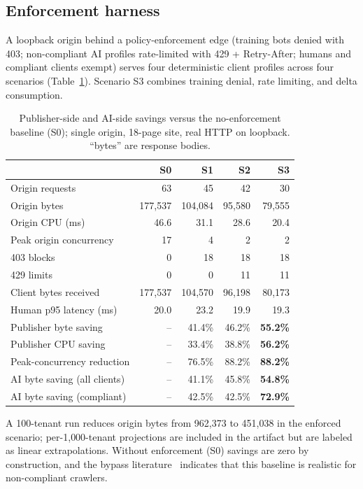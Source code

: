 \documentclass[11pt]{article}
\begin{document}
\subsection{Enforcement harness}

A loopback origin behind a policy-enforcement edge (training bots denied with 403;
non-compliant AI profiles rate-limited with 429 + Retry-After; humans and compliant
clients exempt) serves four deterministic client profiles across four scenarios
(Table~\ref{tab:enforce}). Scenario S3 combines training denial, rate limiting, and
delta consumption.

\begin{table}[t]
\centering
\small
\caption{Publisher-side and AI-side savings versus the no-enforcement baseline (S0);
single origin, 18-page site, real HTTP on loopback. ``bytes'' are response bodies.}
\label{tab:enforce}
\begin{tabular}{lrrrr}
\toprule
 & S0 & S1 & S2 & S3 \\
\midrule
Origin requests              & 63 & 45 & 42 & 30 \\
Origin bytes                 & 177{,}537 & 104{,}084 & 95{,}580 & 79{,}555 \\
Origin CPU (ms)              & 46.6 & 31.1 & 28.6 & 20.4 \\
Peak origin concurrency      & 17 & 4 & 2 & 2 \\
403 blocks                   & 0 & 18 & 18 & 18 \\
429 limits                   & 0 & 0 & 11 & 11 \\
Client bytes received        & 177{,}537 & 104{,}570 & 96{,}198 & 80{,}173 \\
Human p95 latency (ms)       & 20.0 & 23.2 & 19.9 & 19.3 \\
\midrule
Publisher byte saving        & -- & 41.4\% & 46.2\% & \textbf{55.2\%} \\
Publisher CPU saving         & -- & 33.4\% & 38.8\% & \textbf{56.2\%} \\
Peak-concurrency reduction   & -- & 76.5\% & 88.2\% & \textbf{88.2\%} \\
AI byte saving (all clients) & -- & 41.1\% & 45.8\% & \textbf{54.8\%} \\
AI byte saving (compliant)   & -- & 42.5\% & 42.5\% & \textbf{72.9\%} \\
\bottomrule
\end{tabular}
\end{table}

A 100-tenant run reduces origin bytes from 962{,}373 to 451{,}038 in the enforced
scenario; per-1{,}000-tenant projections are included in the artifact but are labeled as
linear extrapolations. Without enforcement (S0) savings are zero by construction, and
the bypass literature~\citep{tollbit} indicates that this baseline is realistic for
non-compliant crawlers.
\end{document}
